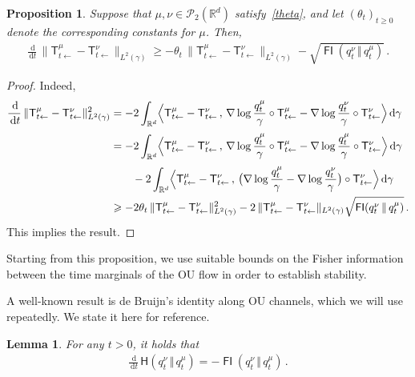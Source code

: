 \documentclass[12pt]{article}
\newcommand{\cP}{\mathcal{P}}
\newcommand{\RR}{\mathbb{R}}
\newcommand{\R}{\RR}
\newcommand{\1}{\mathds{1}}
\newcommand*{\rd}{\mathrm{d}}
\newcommand*{\dd}{\, \rd}
\newcommand{\mmid}{\,\Vert\,}
\DeclareMathOperator*{\FI}{\mathsf{FI}}
\renewcommand{\geq}{\geqslant}
\renewcommand{\ge}{\geqslant}
\newcommand{\KM}{\mathsf T}
\theoremstyle{plain}
\newtheorem{proposition}[theorem]{Proposition}
\newtheorem{lemma}[theorem]{Lemma}
\theoremstyle{definition}
\theoremstyle{remark}
\begin{document}
\begin{proposition}
    Suppose that $\mu,\nu \in \cP_2(\R^d)$ satisfy~\eqref{theta}, and let $(\theta_t)_{t\ge 0}$ denote the corresponding constants for $\mu$.
    Then,
\begin{align}\label{eq:stab_start}
    \frac{\dd}{\dd t} \, \|\KM^\mu_{t\gets} - \KM^\nu_{t\gets}\|_{L^2(\gamma)}\geq -\theta_t\,\|\KM^\mu_{t\gets} - \KM^\nu_{t\gets}\|_{L^2(\gamma)} - \sqrt{\FI(q^\nu_t\mmid q^\mu_t)}\,.
\end{align}
\end{proposition}
\begin{proof}
    Indeed,
    \begin{align*}
        \frac{\dd}{\dd t} \,\|\KM^\mu_{t\gets} - \KM^\nu_{t\gets}\|_{L^2(\gamma)}^2
        &= -2\int_{\RR^d}\Bigl\langle \KM^\mu_{t\gets} - \KM^\nu_{t\gets}\,,\, \nabla \log \frac{q_t^\mu}{\gamma} \circ \KM^\mu_{t\gets} - \nabla \log \frac{q_t^\nu}{\gamma} \circ \KM^\nu_{t\gets}\Bigr\rangle\dd \gamma \\[0.25em]
        &= -2\int_{\RR^d}\Bigl\langle \KM^\mu_{t\gets} - \KM^\nu_{t\gets}\,,\, \nabla \log \frac{q_t^\mu}{\gamma} \circ \KM^\mu_{t\gets} - \nabla \log \frac{q_t^\mu}{\gamma} \circ \KM^\nu_{t\gets}\Bigr\rangle\dd \gamma \\[0.25em]
        &\qquad{} -2\int_{\RR^d}\Bigl\langle \KM^\mu_{t\gets} - \KM^\nu_{t\gets}\,,\, \bigl(\nabla \log \frac{q_t^\mu}{\gamma} - \nabla \log \frac{q_t^\nu}{\gamma}\bigr) \circ \KM^\nu_{t\gets}\Bigr\rangle\dd \gamma \\
        &\ge -2\theta_t\,\|\KM^\mu_{t\gets} - \KM^\nu_{t\gets}\|_{L^2(\gamma)}^2 - 2\,\|\KM^\mu_{t\gets} - \KM^\nu_{t\gets}\|_{L^2(\gamma)} \sqrt{\FI(q_t^\nu \mmid q_t^\mu)}\,.
    \end{align*}
    This implies the result.
\end{proof}
Starting from this proposition, we use suitable bounds on the Fisher information between the time marginals of the OU flow in order to establish stability.

A well-known result is de Bruijn's identity along OU channels, which we will use repeatedly. We state it here for reference.
\begin{lemma}
For any $t > 0$, it holds that
\begin{align*}
    \frac{\dd}{\dd t}\,{\mathsf H}(q_t^\nu\mmid q_t^\mu) = -\FI(q_t^\nu\mmid q_t^\mu)\,.
\end{align*}
\end{lemma}
\end{document}
